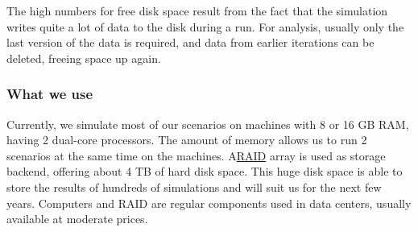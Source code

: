 The  high numbers for free disk space result from the fact that the  simulation writes quite a lot of data to the disk during a run. For  analysis, usually only the last version of the data is required, and  data from earlier iterations can be deleted, freeing space up again.

\subsubsection{What we use}

Currently,  we simulate most of our scenarios on machines with 8 or 16 GB RAM,  having 2 dual-core processors. The amount of memory allows us to run 2  scenarios at the same time on the machines. A\href{http://en.wikipedia.org/wiki/RAID}{RAID}  array is used as storage backend, offering about 4 TB of hard disk  space. This huge disk space is able to store the results of hundreds of  simulations and will suit us for the next few years. Computers and RAID  are regular components used in data centers, usually available at  moderate prices.
